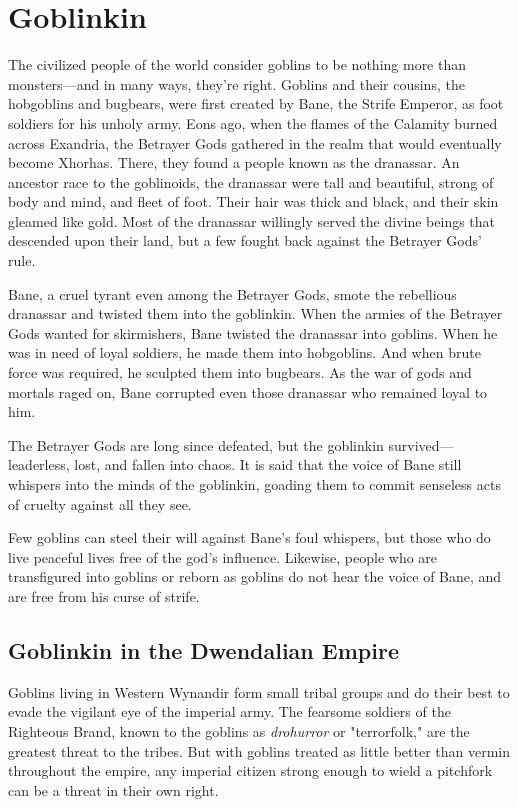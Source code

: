 \documentclass[10pt,a4paper,twoside,bg=print,twocolumn,openany,nodeprecatedcode]{dndbook}
\begin{document}
\section{Goblinkin}
The civilized people of the world consider goblins to be nothing more than monsters—and in many ways, they're right. Goblins and their cousins, the hobgoblins and bugbears, were first created by Bane, the Strife Emperor, as foot soldiers for his unholy army. Eons ago, when the flames of the Calamity burned across Exandria, the Betrayer Gods gathered in the realm that would eventually become Xhorhas. There, they found a people known as the dranassar. An ancestor race to the goblinoids, the dranassar were tall and beautiful, strong of body and mind, and fleet of foot. Their hair was thick and black, and their skin gleamed like gold. Most of the dranassar willingly served the divine beings that descended upon their land, but a few fought back against the Betrayer Gods' rule.

Bane, a cruel tyrant even among the Betrayer Gods, smote the rebellious dranassar and twisted them into the goblinkin. When the armies of the Betrayer Gods wanted for skirmishers, Bane twisted the dranassar into goblins. When he was in need of loyal soldiers, he made them into hobgoblins. And when brute force was required, he sculpted them into bugbears. As the war of gods and mortals raged on, Bane corrupted even those dranassar who remained loyal to him.

The Betrayer Gods are long since defeated, but the goblinkin survived—leaderless, lost, and fallen into chaos. It is said that the voice of Bane still whispers into the minds of the goblinkin, goading them to commit senseless acts of cruelty against all they see.

Few goblins can steel their will against Bane's foul whispers, but those who do live peaceful lives free of the god's influence. Likewise, people who are transfigured into goblins or reborn as goblins do not hear the voice of Bane, and are free from his curse of strife.

\subsection{Goblinkin in the Dwendalian Empire}
Goblins living in Western Wynandir form small tribal groups and do their best to evade the vigilant eye of the imperial army. The fearsome soldiers of the Righteous Brand, known to the goblins as \textit{drohurror} or "terrorfolk," are the greatest threat to the tribes. But with goblins treated as little better than vermin throughout the empire, any imperial citizen strong enough to wield a pitchfork can be a threat in their own right.
\end{document}
